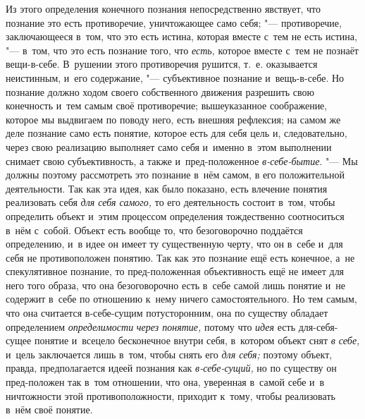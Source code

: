 Из этого определения конечного познания непосредственно
явствует, что познание это есть противоречие, уничтожающее само себя;
"--- противоречие, заключающееся в~том, что это есть истина,
которая вместе с~тем не есть истина, "--- в~том, что это есть
познание того, что {\em есть,}
которое вместе с~тем не познаёт вещи-в-себе. В~рушении этого
противоречия рушится, т.~е. оказывается неистинным, и~его содержание, "---
субъективное познание и~вещь-в-себе. Но познание должно ходом
своего собственного движения разрешить свою конечность и~тем самым своё
противоречие; вышеуказанное соображение, которое мы выдвигаем по поводу
него, есть внешняя рефлексия; на самом же деле познание само есть понятие,
которое есть для себя цель и, следовательно, через свою реализацию
выполняет само себя и~именно в~этом выполнении снимает свою субъективность,
а также и~пред-положенное
{\em в-себе-бытие}.
"--- Мы должны поэтому рассмотреть это познание в~нём самом, в
его положительной деятельности. Так как эта идея, как было показано, есть
влечение понятия реализовать себя
{\em для себя самого,} то
его деятельность состоит в~том, чтобы определить объект и~этим процессом
определения тождественно соотноситься в~нём с~собой. Объект есть вообще то,
что безоговорочно поддаётся определению, и~в идее он имеет ту существенную
черту, что он в~себе и~для себя не противоположен понятию. Так как это
познание ещё есть конечное, а~не спекулятивное познание, то пред-положенная
объективность ещё не имеет для него того образа, что она безоговорочно есть
в~себе самой лишь понятие и~не содержит в~себе по отношению к~нему ничего
самостоятельного. Но тем самым, что она считается в-себе-сущим
потусторонним, она по существу обладает определением
{\em определимости}
{\em через понятие,}
потому что {\em идея}
есть для-себя-сущее понятие и~всецело бесконечное внутри
себя, в~котором объект снят {\em в
себе,} и~цель заключается лишь в~том, чтобы снять его
{\em для себя;} поэтому
объект, правда, предполагается идеей познания как
{\em в-себе-сущий,} но по
существу он пред-положен так в~том отношении, что она,
уверенная в~самой себе и~в ничтожности этой
противоположности, приходит к~тому, чтобы реализовать в~нём своё понятие.

